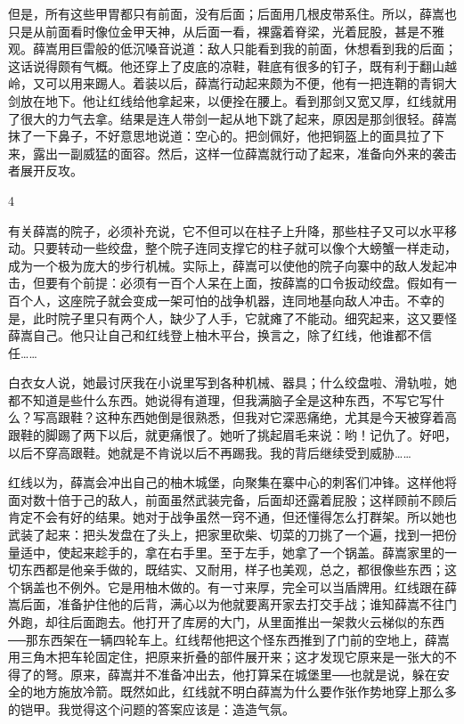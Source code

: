 但是，所有这些甲胃都只有前面，没有后面；后面用几根皮带系住。所以，薛嵩也只是从前面看时像位金甲天神，从后面一看，裸露着脊梁，光着屁股，甚是不雅观。薛嵩用巨雷般的低沉嗓音说道：敌人只能看到我的前面，休想看到我的后面；这话说得颇有气概。他还穿上了皮底的凉鞋，鞋底有很多的钉子，既有利于翻山越岭，又可以用来踢人。着装以后，薛嵩行动起来颇为不便，他有一把连鞘的青铜大剑放在地下。他让红线给他拿起来，以便拴在腰上。看到那剑又宽又厚，红线就用了很大的力气去拿。结果是连人带剑一起从地下跳了起来，原因是那剑很轻。薛嵩抹了一下鼻子，不好意思地说道：空心的。把剑佩好，他把铜盔上的面具拉了下来，露出一副威猛的面容。然后，这样一位薛嵩就行动了起来，准备向外来的袭击者展开反攻。 

4 

有关薛嵩的院子，必须补充说，它不但可以在柱子上升降，那些柱子又可以水平移动。只要转动一些绞盘，整个院子连同支撑它的柱子就可以像个大螃蟹一样走动，成为一个极为庞大的步行机械。实际上，薛嵩可以使他的院子向寨中的敌人发起冲击，但要有个前提：必须有一百个人呆在上面，按薛嵩的口令扳动绞盘。假如有一百个人，这座院子就会变成一架可怕的战争机器，连同地基向敌人冲击。不幸的是，此时院子里只有两个人，缺少了人手，它就瘫了不能动。细究起来，这又要怪薛嵩自己。他只让自己和红线登上柚木平台，换言之，除了红线，他谁都不信任…… 

白衣女人说，她最讨厌我在小说里写到各种机械、器具；什么绞盘啦、滑轨啦，她都不知道是些什么东西。她说得有道理，但我满脑子全是这种东西，不写它写什么？写高跟鞋？这种东西她倒是很熟悉，但我对它深恶痛绝，尤其是今天被穿着高跟鞋的脚踢了两下以后，就更痛恨了。她听了挑起眉毛来说：哟！记仇了。好吧，以后不穿高跟鞋。她就是不肯说以后不再踢我。我的背后继续受到威胁…… 

红线以为，薛嵩会冲出自己的柚木城堡，向聚集在寨中心的刺客们冲锋。这样他将面对数十倍于己的敌人，前面虽然武装完备，后面却还露着屁股；这样顾前不顾后肯定不会有好的结果。她对于战争虽然一窍不通，但还懂得怎么打群架。所以她也武装了起来：把头发盘在了头上，把家里砍柴、切菜的刀挑了一个遍，找到一把份量适中，使起来趁手的，拿在右手里。至于左手，她拿了一个锅盖。薛嵩家里的一切东西都是他亲手做的，既结实、又耐用，样子也美观，总之，都很像些东西；这个锅盖也不例外。它是用柚木做的。有一寸来厚，完全可以当盾牌用。红线跟在薛嵩后面，准备护住他的后背，满心以为他就要离开家去打交手战；谁知薛嵩不往门外跑，却往后面跑去。他打开了库房的大门，从里面推出一架救火云梯似的东西──那东西架在一辆四轮车上。红线帮他把这个怪东西推到了门前的空地上，薛嵩用三角木把车轮固定住，把原来折叠的部件展开来；这才发现它原来是一张大的不得了的弩。原来，薛嵩并不准备冲出去，他打算呆在城堡里──也就是说，躲在安全的地方施放冷箭。既然如此，红线就不明白薛嵩为什么要作张作势地穿上那么多的铠甲。我觉得这个问题的答案应该是：造造气氛。 

